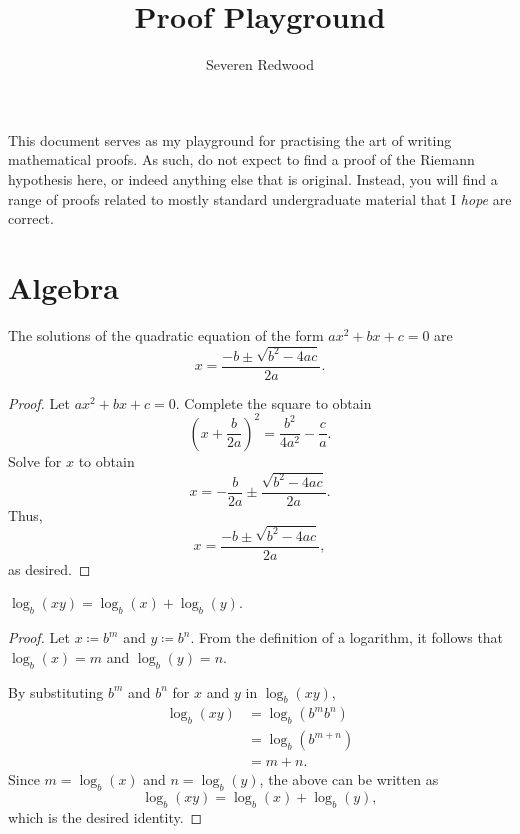\documentclass[headings=standardclasses]{scrartcl}
\title{Proof Playground}
\author{Severen Redwood}
\date{}
\begin{document}
\maketitle

\noindent This document serves as my playground for practising the art of
writing mathematical proofs. As such, do not expect to find a proof of the
Riemann hypothesis here, or indeed anything else that is original. Instead, you
will find a range of proofs related to mostly standard undergraduate material
that I \textit{hope} are correct.

\section*{Algebra}

\begin{theorem}
  The solutions of the quadratic equation of the form \(ax^2 + bx + c = 0\) are
  \[ x = \frac{-b ±\sqrt{b^2 - 4ac}}{2a}. \]
\end{theorem}

\begin{proof}
  Let \(ax^{2} + bx + c = 0\). Complete the square to obtain
  \begin{equation*}
    {\left(x + \frac{b}{2a}\right)}^2 = \frac{b^{2}}{4a^{2}} - \frac{c}{a}.
  \end{equation*}
  Solve for \(x\) to obtain
  \begin{equation*}
    x = -\frac{b}{2a} ±\frac{\sqrt{b^2 - 4ac}}{2a}.
  \end{equation*}
  Thus,
  \begin{equation*}
    x = \frac{-b ± \sqrt{b^2 - 4ac}}{2a},
  \end{equation*}
  as desired.
\end{proof}

\begin{theorem}
  \(\displaystyle \log_{b}(xy) = \log_{b}(x) + \log_{b}(y)\).
\end{theorem}

\begin{proof}
  Let \(x ≔ b^m\) and \(y ≔ b^n\). From the definition of a logarithm, it
  follows that \(\log_b(x) = m\) and \(\log_b(y) = n\).

  By substituting \(b^m\) and \(b^n\) for \(x\) and \(y\) in \(\log_b(xy)\),
  \begin{equation*}
  \begin{split}
    \log_b(xy) &= \log_b(b^{m}b^{n}) \\
               &= \log_b(b^{m + n}) \\
               &= m + n.
  \end{split}
  \end{equation*}
  Since \(m = \log_b(x)\) and \(n = \log_b(y)\), the above can be written as
  \begin{equation*}
    \log_b(xy) = \log_b(x) + \log_b(y),
  \end{equation*}
  which is the desired identity.
\end{proof}
\end{document}
